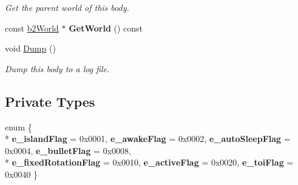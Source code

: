 \begin{DoxyCompactItemize}
\begin{DoxyCompactList}\small\item\em Get the parent world of this body. \end{DoxyCompactList}\item 
const \hyperlink{classb2_world}{b2\+World} $\ast$ {\bfseries Get\+World} () const \hypertarget{classb2_body_aee495ab2131b3123e0cfc5ed106b2fda}{}\label{classb2_body_aee495ab2131b3123e0cfc5ed106b2fda}

\item 
void \hyperlink{classb2_body_ac9e482f7d9df92801c24e79a7e751d06}{Dump} ()\hypertarget{classb2_body_ac9e482f7d9df92801c24e79a7e751d06}{}\label{classb2_body_ac9e482f7d9df92801c24e79a7e751d06}

\begin{DoxyCompactList}\small\item\em Dump this body to a log file. \end{DoxyCompactList}\end{DoxyCompactItemize}
\subsection*{Private Types}
\begin{DoxyCompactItemize}
\item 
enum \{ \\*
{\bfseries e\+\_\+island\+Flag} = 0x0001, 
{\bfseries e\+\_\+awake\+Flag} = 0x0002, 
{\bfseries e\+\_\+auto\+Sleep\+Flag} = 0x0004, 
{\bfseries e\+\_\+bullet\+Flag} = 0x0008, 
\\*
{\bfseries e\+\_\+fixed\+Rotation\+Flag} = 0x0010, 
{\bfseries e\+\_\+active\+Flag} = 0x0020, 
{\bfseries e\+\_\+toi\+Flag} = 0x0040
 \}\hypertarget{classb2_body_af41a158dfe3e0e55bcaaca9ba36f1777}{}\label{classb2_body_af41a158dfe3e0e55bcaaca9ba36f1777}

\end{DoxyCompactItemize}
